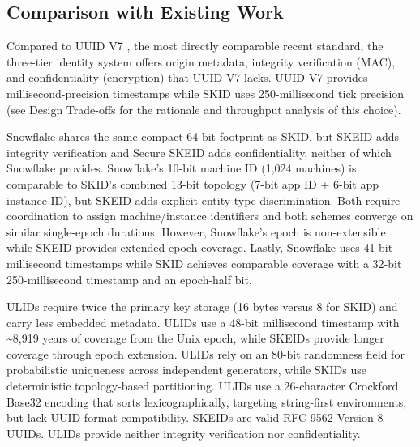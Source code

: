 \documentclass[a4paper,fleqn]{cas-sc}
\begin{document}
\subsection{Comparison with Existing
Work}\label{comparison-with-existing-work}

Compared to UUID V7 \citep{rfc9562}, the most directly comparable recent
standard, the three-tier identity system offers origin metadata,
integrity verification (MAC), and confidentiality (encryption) that UUID
V7 lacks. UUID V7 provides millisecond-precision timestamps while SKID
uses 250-millisecond tick precision (see Design Trade-offs for the
rationale and throughput analysis of this choice).

Snowflake \citep{snowflake} shares the same compact 64-bit footprint as
SKID, but SKEID adds integrity verification and Secure SKEID adds
confidentiality, neither of which Snowflake provides. Snowflake's 10-bit
machine ID (1,024 machines) is comparable to SKID's combined 13-bit
topology (7-bit app ID + 6-bit app instance ID), but SKEID adds explicit
entity type discrimination. Both require coordination to assign
machine/instance identifiers and both schemes converge on similar
single-epoch durations. However, Snowflake's epoch is non-extensible
while SKEID provides extended epoch coverage. Lastly, Snowflake uses
41-bit millisecond timestamps while SKID achieves comparable coverage
with a 32-bit 250-millisecond timestamp and an epoch-half bit.

ULIDs \citep{ulid} require twice the primary key storage (16 bytes
versus 8 for SKID) and carry less embedded metadata. ULIDs use a 48-bit
millisecond timestamp with \textasciitilde8,919 years of coverage from
the Unix epoch, while SKEIDs provide longer coverage through epoch
extension. ULIDs rely on an 80-bit randomness field for probabilistic
uniqueness across independent generators, while SKIDs use deterministic
topology-based partitioning. ULIDs use a 26-character Crockford Base32
encoding that sorts lexicographically, targeting string-first
environments, but lack UUID format compatibility. SKEIDs are valid RFC
9562 Version 8 UUIDs. ULIDs provide neither integrity verification nor
confidentiality.
\end{document}

